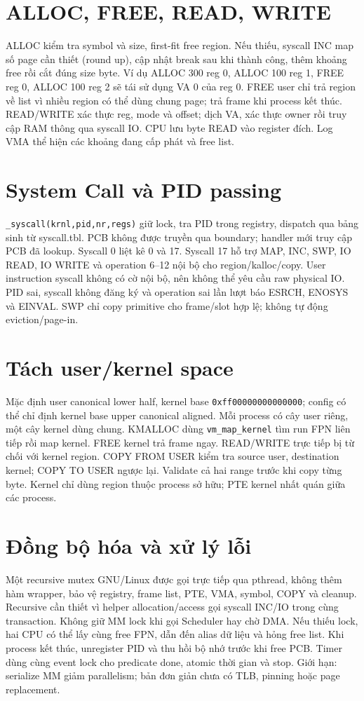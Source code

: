\documentclass[11pt,a4paper]{article}
\begin{document}
\section{ALLOC, FREE, READ, WRITE}
ALLOC kiểm tra symbol và size, first-fit free region. Nếu thiếu, syscall INC map số page cần thiết (round up), cập nhật break sau khi thành công, thêm khoảng free rồi cắt đúng size byte. Ví dụ ALLOC 300 reg 0, ALLOC 100 reg 1, FREE reg 0, ALLOC 100 reg 2 sẽ tái sử dụng VA 0 của reg 0. FREE user chỉ trả region về list vì nhiều region có thể dùng chung page; trả frame khi process kết thúc. READ/WRITE xác thực reg, mode và offset; dịch VA, xác thực owner rồi truy cập RAM thông qua syscall IO. CPU lưu byte READ vào register đích. Log VMA thể hiện các khoảng đang cấp phát và free list.
\section{System Call và PID passing}
\texttt{\_syscall(krnl,pid,nr,regs)} giữ lock, tra PID trong registry, dispatch qua bảng sinh từ syscall.tbl. PCB không được truyền qua boundary; handler mới truy cập PCB đã lookup. Syscall 0 liệt kê 0 và 17. Syscall 17 hỗ trợ MAP, INC, SWP, IO READ, IO WRITE và operation 6--12 nội bộ cho region/kalloc/copy. User instruction syscall không có cờ nội bộ, nên không thể yêu cầu raw physical IO. PID sai, syscall không đăng ký và operation sai lần lượt báo ESRCH, ENOSYS và EINVAL. SWP chỉ copy primitive cho frame/slot hợp lệ; không tự động eviction/page-in.
\section{Tách user/kernel space}
Mặc định user canonical lower half, kernel base \texttt{0xff00000000000000}; config có thể chỉ định kernel base upper canonical aligned. Mỗi process có cây user riêng, một cây kernel dùng chung. KMALLOC dùng \texttt{vm\_map\_kernel} tìm run FPN liên tiếp rồi map kernel. FREE kernel trả frame ngay. READ/WRITE trực tiếp bị từ chối với kernel region. COPY FROM USER kiểm tra source user, destination kernel; COPY TO USER ngược lại. Validate cả hai range trước khi copy từng byte. Kernel chỉ dùng region thuộc process sở hữu; PTE kernel nhất quán giữa các process.
\section{Đồng bộ hóa và xử lý lỗi}
Một recursive mutex GNU/Linux được gọi trực tiếp qua pthread, không thêm hàm wrapper, bảo vệ registry, frame list, PTE, VMA, symbol, COPY và cleanup. Recursive cần thiết vì helper allocation/access gọi syscall INC/IO trong cùng transaction. Không giữ MM lock khi gọi Scheduler hay chờ DMA. Nếu thiếu lock, hai CPU có thể lấy cùng free FPN, dẫn đến alias dữ liệu và hỏng free list. Khi process kết thúc, unregister PID và thu hồi bộ nhớ trước khi free PCB. Timer dùng cùng event lock cho predicate done, atomic thời gian và stop. Giới hạn: serialize MM giảm parallelism; bản đơn giản chưa có TLB, pinning hoặc page replacement.
\newpage
\end{document}
